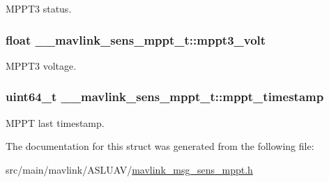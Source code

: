 M\+P\+P\+T3 status. 

\hypertarget{struct____mavlink__sens__mppt__t_a67ffaddda7c7e525147eb34fa217015f}{
\subsubsection[{mppt3\+\_\+volt}]{\setlength{\rightskip}{0pt plus 5cm}float \+\_\+\+\_\+mavlink\+\_\+sens\+\_\+mppt\+\_\+t\+::mppt3\+\_\+volt}}\label{struct____mavlink__sens__mppt__t_a67ffaddda7c7e525147eb34fa217015f}


M\+P\+P\+T3 voltage. 

\hypertarget{struct____mavlink__sens__mppt__t_a884b19c39378d9c856c8b16af1fb3088}{
\subsubsection[{mppt\+\_\+timestamp}]{\setlength{\rightskip}{0pt plus 5cm}uint64\+\_\+t \+\_\+\+\_\+mavlink\+\_\+sens\+\_\+mppt\+\_\+t\+::mppt\+\_\+timestamp}}\label{struct____mavlink__sens__mppt__t_a884b19c39378d9c856c8b16af1fb3088}


M\+P\+P\+T last timestamp. 



The documentation for this struct was generated from the following file\+:\begin{DoxyCompactItemize}
\item 
src/main/mavlink/\+A\+S\+L\+U\+A\+V/\hyperlink{mavlink__msg__sens__mppt_8h}{mavlink\+\_\+msg\+\_\+sens\+\_\+mppt.\+h}\end{DoxyCompactItemize}
